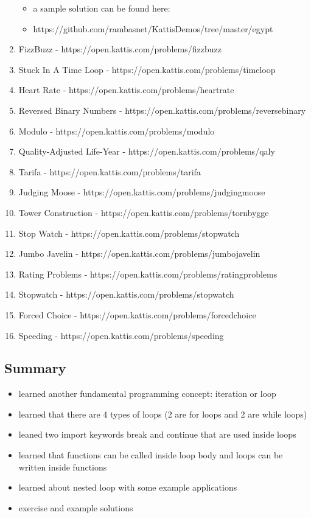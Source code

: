 \documentclass[11pt]{article}
\providecommand{\tightlist}{%
      \setlength{\itemsep}{0pt}\setlength{\parskip}{0pt}}
\begin{document}
\begin{enumerate}
  \begin{itemize}
  \tightlist
  \item
    a sample solution can be found here:
  \item
    https://github.com/rambasnet/KattisDemos/tree/master/egypt
  \end{itemize}
\item
  FizzBuzz - https://open.kattis.com/problems/fizzbuzz
\item
  Stuck In A Time Loop - https://open.kattis.com/problems/timeloop
\item
  Heart Rate - https://open.kattis.com/problems/heartrate
\item
  Reversed Binary Numbers -
  https://open.kattis.com/problems/reversebinary
\item
  Modulo - https://open.kattis.com/problems/modulo
\item
  Quality-Adjusted Life-Year - https://open.kattis.com/problems/qaly
\item
  Tarifa - https://open.kattis.com/problems/tarifa
\item
  Judging Moose - https://open.kattis.com/problems/judgingmoose
\item
  Tower Construction - https://open.kattis.com/problems/tornbygge
\item
  Stop Watch - https://open.kattis.com/problems/stopwatch
\item
  Jumbo Javelin - https://open.kattis.com/problems/jumbojavelin
\item
  Rating Problems - https://open.kattis.com/problems/ratingproblems
\item
  Stopwatch - https://open.kattis.com/problems/stopwatch
\item
  Forced Choice - https://open.kattis.com/problems/forcedchoice
\item
  Speeding - https://open.kattis.com/problems/speeding
\end{enumerate}

    \hypertarget{summary}{%
\subsection{Summary}\label{summary}}

\begin{itemize}
\tightlist
\item
  learned another fundamental programming concept: iteration or loop
\item
  learned that there are 4 types of loops (2 are for loops and 2 are
  while loops)
\item
  leaned two import keywords break and continue that are used inside
  loops
\item
  learned that functions can be called inside loop body and loops can be
  written inside functions
\item
  learned about nested loop with some example applications
\item
  exercise and example solutions
\end{itemize}
\end{document}
